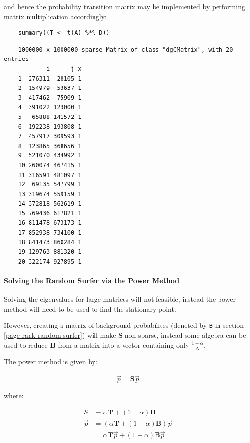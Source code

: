 \documentclass[11pt]{report}
\begin{document}
and hence the probability transition matrix may be implemented by performing matrix multiplication accordingly:

\begin{tcolorbox}
    \begin{verbatim}
    summary((T <- t(A) %*% D))
    \end{verbatim}
\tcblower
    \begin{verbatim}
    1000000 x 1000000 sparse Matrix of class "dgCMatrix", with 20 entries
            i      j x
    1  276311  28105 1
    2  154979  53637 1
    3  417462  75909 1
    4  391022 123000 1
    5   65888 141572 1
    6  192238 193808 1
    7  457917 309593 1
    8  123865 368656 1
    9  521070 434992 1
    10 260074 467415 1
    11 316591 481097 1
    12  69135 547799 1
    13 319674 559159 1
    14 372818 562619 1
    15 769436 617821 1
    16 811478 673173 1
    17 852938 734100 1
    18 841473 860284 1
    19 129763 881320 1
    20 322174 927895 1
    \end{verbatim}
\end{tcolorbox}

\paragraph{Solving the Random Surfer via the Power Method}
\label{random-surfer-sparse-fix}
Solving the eigenvalues for large matrices will not feasible, instead the power method will need to be used to find the stationary point.

However, creating a matrix of background probabilites (denoted by \texttt{B} in section \ref{page-rank-random-surfer}) will make \(\mathbf{S}\)  non sparse, instead some algebra can be used to reduce \(\mathbf{B}\) from a matrix into a vector containing only \(\frac{1-\alpha}{N}\).

The power method is given by:

\begin{align}
\vec{p}= \mathbf{S} \vec{p}
\end{align}

where:

\begin{align}
S &= \alpha \mathbf{T} +  \left( 1 - \alpha \right) \mathbf{B} \\
\vec{p} &= \left( \alpha \mathbf{T} +  \left( 1 - \alpha \right) \mathbf{B} \right) \vec{p}\\
&= \alpha \mathbf{T}\vec{p} +  \left( 1-\alpha \right) \mathbf{B} \vec{p}
\end{align}
\end{document}
